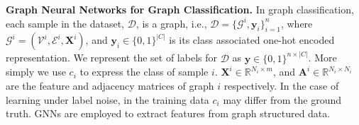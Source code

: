 \textbf{Graph Neural Networks for Graph Classification. }In graph classification, each sample in the dataset, $\mathcal{D}$, is a graph, i.e.,  $\mathcal{D} = \{\mathcal{G}^{i}, \mathbf{y}_i\}_{i = 1}^{n}$, where $\mathcal{G}^{i} = (\mathcal{V}^i, \mathcal{E}^i, \mathbf{X}^i)$, and $\mathbf{y}_i \in \{0, 1\}^{|C|}$ is its class associated one-hot encoded representation.
We represent the set of labels for $\mathcal{D}$ as $\mathbf{y} \in \{0, 1\}^{n \times |C|}$. More simply we use $c_i$ to express the class of sample $i$. $\mathbf{X}^i \in \mathbb{R}^{N_i \times m}$, and $\mathbf{A}^i \in \mathbb{R}^{N_i \times N_i}$ are the feature and adjacency matrices of graph $i$ respectively.
In the case of learning under label noise, in the training data $c_i$ may differ from the ground truth. GNNs are employed to extract features from graph structured data. 
